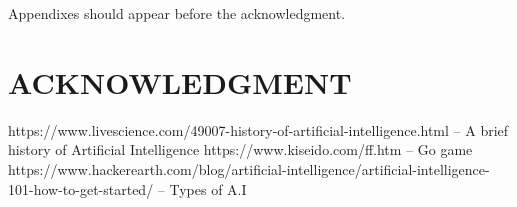 \documentclass[letterpaper, 10 pt, conference]{ieeeconf}  %
\begin{document}
Appendixes should appear before the acknowledgment.

\section*{ACKNOWLEDGMENT}

\begin{thebibliography}{99}

 https://www.livescience.com/49007-history-of-artificial-intelligence.html -- A brief history of Artificial Intelligence
 https://www.kiseido.com/ff.htm -- Go game 
 https://www.hackerearth.com/blog/artificial-intelligence/artificial-intelligence-101-how-to-get-started/ -- Types of A.I






\end{thebibliography}
\end{document}
